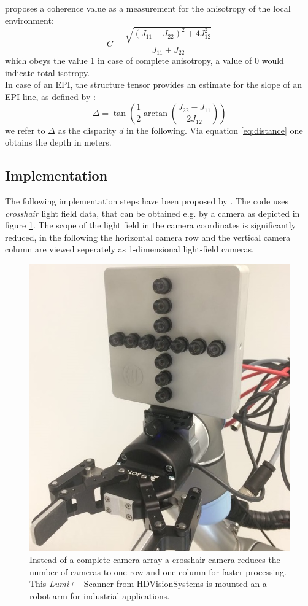 \documentclass  [
  paper    = a4,
  BCOR     = 10mm,
  twoside,
  fontsize = 12pt,
  fleqn,
  toc      = bibnumbered,
  toc      = listofnumbered,
  numbers  = noendperiod,
  headings = normal,
  listof   = leveldown,
  version  = 3.03
]                                       {scrreprt}
\begin{document}
   \cite{jahne2013digitale} proposes a coherence value as a measurement for the anisotropy of the local environment:
 \begin{equation}\label{eq:coherence}
 C = \frac{\sqrt{(J_{11} - J_{22})^2 + 4J_{12}^2}}{J_{11} + J_{22}}
 \end{equation}
 which obeys the value 1 in case of complete anisotropy, a value of 0 would indicate total isotropy.\\
 In case of an EPI, the structure tensor provides an estimate for the slope of an EPI line, as defined by \cite{bigun1987optimal}:
 \begin{equation}\label{eq:disparity}
 \Delta = \tan\left(\frac{1}{2} \arctan\left( \frac{J_{22}-J_{11}}{2J_{12}}\right)\right)
 \end{equation}
 we refer to $\Delta$ as the disparity $d$ in the following. Via equation \ref{eq:distance} one obtains the depth in meters.
 
 \subsection{Implementation}
 The following implementation steps have been proposed by \cite{wanner2014orientation}. The code uses \textit{crosshair} light field data, that can be obtained e.g. by a camera as depicted in figure \ref{fig:lumiplus}. The scope of the light field in the camera coordinates is significantly reduced, in the following the horizontal camera row and the vertical camera column are viewed seperately as 1-dimensional light-field cameras.\\
 \begin{figure}[]
 	\centering
 	\includegraphics[width=0.7\linewidth]{images/Lumiplus}
 	\caption[LumiPlus Scanner from HDVisionSystems]{Instead of a complete camera array a crosshair camera reduces the number of cameras to one row and one column for faster processing. This \textit{Lumi+} - Scanner from HDVisionSystems is mounted an a robot arm for industrial applications.}
 	\label{fig:lumiplus}
 \end{figure}
 
\end{document}
